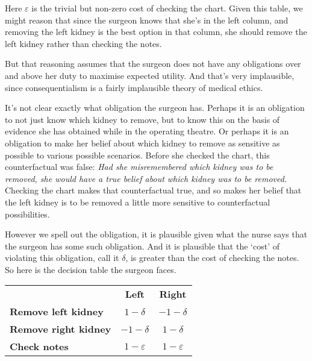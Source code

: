 \documentclass[
  11pt,
  letterpaper,
  DIV=11,
  numbers=noendperiod,
  oneside]{scrartcl}
\begin{document}
Here \(\varepsilon\) is the trivial but non-zero cost of checking the
chart. Given this table, we might reason that since the surgeon knows
that she's in the left column, and removing the left kidney is the best
option in that column, she should remove the left kidney rather than
checking the notes.

But that reasoning assumes that the surgeon does not have any
obligations over and above her duty to maximise expected utility. And
that's very implausible, since consequentialism is a fairly implausible
theory of medical ethics.

It's not clear exactly what obligation the surgeon has. Perhaps it is an
obligation to not just know which kidney to remove, but to know this on
the basis of evidence she has obtained while in the operating theatre.
Or perhaps it is an obligation to make her belief about which kidney to
remove as sensitive as possible to various possible scenarios. Before
she checked the chart, this counterfactual was false: \emph{Had she
misremembered which kidney was to be removed, she would have a true
belief about which kidney was to be removed.} Checking the chart makes
that counterfactual true, and so makes her belief that the left kidney
is to be removed a little more sensitive to counterfactual
possibilities.

However we spell out the obligation, it is plausible given what the
nurse says that the surgeon has some such obligation. And it is
plausible that the `cost' of violating this obligation, call it
\(\delta\), is greater than the cost of checking the notes. So here is
the decision table the surgeon faces.

\begin{longtable}[]{@{}lcc@{}}
\toprule\noalign{}
\endhead
\bottomrule\noalign{}
\endlastfoot
& \textbf{Left} & \textbf{Right} \\
\textbf{Remove left kidney} & \(1-\delta\) & \(-1-\delta\) \\
\textbf{Remove right kidney} & \(-1-\delta\) & \(1-\delta\) \\
\textbf{Check notes} & \(1-\varepsilon\) & \(1-\varepsilon\) \\
\end{longtable}
\end{document}
